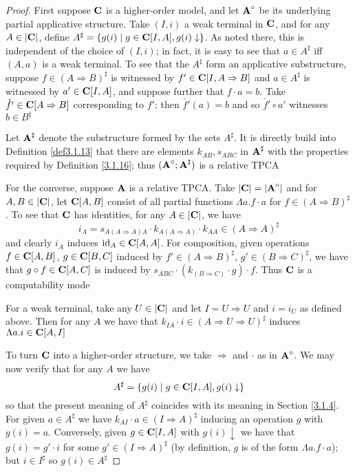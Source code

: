 \documentclass[11pt]{article}
\begin{document}
\begin{proof}
First suppose \(\operatorname{\textbf{C}}\) is a higher-order model, and let \(\operatorname{\textbf{A}}^\circ\) be its underlying partial
applicative structure. Take \((I,i)\) a weak terminal in \(\operatorname{\textbf{C}}\), and for any \(A\in\abs{\bC}\),
define \(A^\sharp=\{g(i)\mid g\in\operatorname{\textbf{C}}[I,A],g(i)\downarrow\}\). As noted there, this is independent of the choice
of \((I,i)\); in fact, it is easy to see that \(a\in A^\sharp\) iff \((A,a)\) is a weak terminal. To
see that the \(A^\sharp\) form an applicative substructure, suppose \(f\in(A\Rightarrow B)^\sharp\) is witnessed
by \(f'\in\operatorname{\textbf{C}}[I,A\Rightarrow B]\) and \(a\in A^\sharp\) is witnessed by \(a'\in\operatorname{\textbf{C}}[I,A]\), and suppose further
that \(f\cdot a=b\). Take \(\check{f'}\in\operatorname{\textbf{C}}[A\Rightarrow B]\) corresponding to \(f'\); then \(\check{f'}(a)=b\)
and so \(\check{f'}\circ a'\) witnesses \(b\in B^\sharp\)

Let \(\operatorname{\textbf{A}}^\sharp\) denote the substructure formed by the sets \(A^\sharp\). It is directly build into
Definition \ref{def3.1.13} that there are elements \(k_{AB}, s_{ABC}\) in \(\operatorname{\textbf{A}}^\sharp\) with the
properties required by Definition \ref{3.1.16}; thus \((\operatorname{\textbf{A}}^\circ;\operatorname{\textbf{A}}^\sharp)\) is a relative TPCA

For the converse, suppose \(\operatorname{\textbf{A}}\) is a relative TPCA. Take \(\abs{\bC}=\abs{\bA^\circ}\) and
for \(A,B\in\abs{\bC}\), let \(\operatorname{\textbf{C}}[A,B]\) consist of all partial functions \(\Lambda a.f\cdot a\)
for \(f\in(A\Rightarrow B)^\sharp\). To see that \(\operatorname{\textbf{C}}\) has identities, for any \(A\in\abs{\bC}\), we have
\begin{equation*}
i_A=s_{A(A\Rightarrow A)A}\cdot k_{A(A\Rightarrow A)}\cdot k_{AA}\in(A\Rightarrow A)^\sharp
\end{equation*}
and clearly \(i_A\) induces \(\operatorname{id}_A\in\operatorname{\textbf{C}}[A,A]\).  For composition, given
operations \(f\in\operatorname{\textbf{C}}[A,B]\), \(g\in\operatorname{\textbf{C}}[B,C]\) induced by \(f'\in(A\Rightarrow B)^\sharp\), \(g'\in(B\Rightarrow C)^\sharp\), we have
that \(g\circ f\in\operatorname{\textbf{C}}[A,C]\) is induced by \(s_{ABC}\cdot(k_{(B\Rightarrow C)}\cdot g)\cdot f\). Thus \(\operatorname{\textbf{C}}\) is a computability
mode

For a weak terminal, take any \(U\in\abs{\bC}\) and let \(I=U\Rightarrow U\) and \(i=i_U\) as defined above.
Then for any \(A\) we have that \(k_{IA}\cdot i\in(A\Rightarrow U\Rightarrow U)^\sharp\) induces \(\Lambda a.i\in\operatorname{\textbf{C}}[A,I]\)

To turn \(\operatorname{\textbf{C}}\) into a higher-order structure, we take \(\Rightarrow\) and \(\cdot\) as in \(\operatorname{\textbf{A}}^\circ\). We may now
verify that for any \(A\) we have
\begin{equation*}
A^\sharp=\{g(i)\mid g\in\operatorname{\textbf{C}}[I,A],g(i)\downarrow\}
\end{equation*}
so that the present meaning of \(A^\sharp\) coincides with its meaning in Section \ref{3.1.4}. For
given \(a\in A^\sharp\) we have \(k_{AI}\cdot a\in(I\Rightarrow A)^\sharp\) inducing an operation \(g\) with \(g(i)=a\).
Conversely, given \(g\in\operatorname{\textbf{C}}[I,A]\) with \(g(i)\downarrow\) we have that \(g(i)=g'\cdot i\) for
some \(g'\in(I\Rightarrow A)^\sharp\) (by definition, \(g\) is of the form \(\Lambda a.f\cdot a\)); but \(i\in I^\sharp\) so \(g(i)\in A^\sharp\)


\end{proof}
\end{document}
